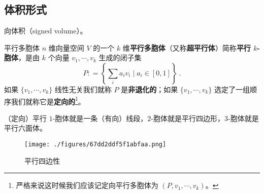 
\begin{issues}
\issueDraft
\end{issues}


\subsection{体积形式}




向体积（signed volume）。

\begin{definition}{平行多胞体}
$n$ 维向量空间 $V$ 的一个 $k$ 维\textbf{平行多胞体}（又称\textbf{超平行体}）简称\textbf{平行 $k$-胞体}，是由 $k$ 个向量 $v_1, \cdots, v_k$ 生成的闭子集
\begin{equation}
P: = \left\{ \sum_i a_i v_i \mid a_i \in [0, 1] \right\}~.
\end{equation}
如果 $\{v_1, \cdots, v_k\}$ 线性无关我们就称 $P$ 是\textbf{非退化的}；如果 $\{v_1, \cdots, v_k\}$ 选定了一组顺序我们就称它是\textbf{定向的}\footnote{严格来说这时候我们应该记定向平行多胞体为 $(P, v_1, \cdots, v_k)$。}。
\end{definition}

\begin{example}{}
（定向）平行 $1$-胞体就是一条（有向）线段，$2$-胞体就是平行四边形，$3$-胞体就是平行六面体。
\end{example}

\begin{figure}[ht]
\centering
\texttt{[image: ./figures/67dd2ddf5f1abfaa.png]}
\caption{平行四边性} \label{fig_APdet_3}
\end{figure}

